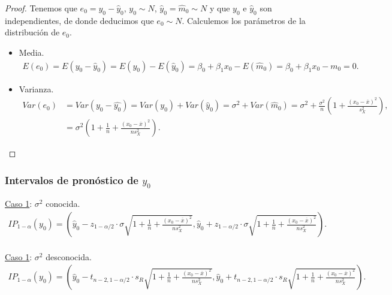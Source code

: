 \begin{proof}
    Tenemos que $e_0 = y_0 - \widehat{y}_0$, $y_0 \sim N$, $\widehat{y}_0 = \widehat{m}_0 \sim N$ y que $y_0$ e $\widehat{y}_0$ son independientes, de donde deducimos que $e_0 \sim N$. Calculemos los parámetros de la distribución de $e_0$.
    \begin{itemize}
        \item Media.
        \begin{align*}
            E(e_0) = E(y_0 - \widehat{y}_0) = E(y_0) - E(\widehat{y}_0) = \beta_0 + \beta_1 x_0 - E(\widehat{m}_0) 
            = \beta_0 + \beta_1 x_0 - m_0 = 0.
        \end{align*}
        \item Varianza.
        \begin{align*}
            Var(e_0) &= Var(y_0 - \widehat{y_0}) = Var(y_0) + Var(\widehat{y}_0) = \sigma^2 + Var(\widehat{m}_0) = \sigma^2 + \frac{\sigma^2}{n}\left( 1 + \frac{(x_0 - \overline{x})^2}{s_X^2} \right), \\
            &= \sigma^2 \left(1+\frac{1}{n}+\frac{(x_0-\overline{x})^2}{ns_X^2} \right).
        \end{align*}
    \end{itemize}
\end{proof}

\subsubsection{Intervalos de pronóstico de $y_0$}
\noindent \underline{Caso 1}: $\sigma^2$ conocida.
\begin{align*}
    IP_{1-\alpha}(y_0) = \left( \widehat{y}_0 - z_{1-\alpha/2} \cdot \sigma \sqrt{1 + \frac{1}{n} + \frac{(x_0 - \overline{x})^2}{ns_X^2}}, \widehat{y}_0 + z_{1-\alpha/2} \cdot \sigma \sqrt{1 + \frac{1}{n} + \frac{(x_0 - \overline{x})^2}{ns_X^2}}  \right).
\end{align*}
\\
\newline
\noindent \underline{Caso 1}: $\sigma^2$ desconocida.
\begin{align*}
    IP_{1-\alpha}(y_0) = \left( \widehat{y}_0 - t_{n-2,1-\alpha/2} \cdot s_R \sqrt{1 + \frac{1}{n} + \frac{(x_0 - \overline{x})^2}{ns_X^2}}, \widehat{y}_0 + t_{n-2,1-\alpha/2} \cdot s_R \sqrt{1 + \frac{1}{n} + \frac{(x_0 - \overline{x})^2}{ns_X^2}}  \right).
\end{align*}


